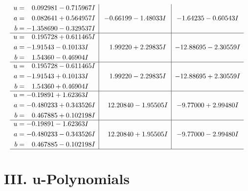 \documentclass[1p]{elsarticle_modified}
\theoremstyle{definition}
\begin{document}
$$\begin{array}{c|c|c}
\begin{aligned}
u &= \phantom{-}0.092981 - 0.715967 I \\
a &= \phantom{-}0.082641 + 0.564957 I \\
b &= -1.358690 - 0.329537 I\end{aligned}
 & -0.66199 - 1.48033 I & -1.64235 - 0.60543 I \\ \hline\begin{aligned}
u &= \phantom{-}0.195728 + 0.611465 I \\
a &= -1.91543 - 0.10133 I \\
b &= \phantom{-}1.54360 - 0.46904 I\end{aligned}
 & \phantom{-}1.99220 + 2.29835 I & -12.88695 - 2.30559 I \\ \hline\begin{aligned}
u &= \phantom{-}0.195728 - 0.611465 I \\
a &= -1.91543 + 0.10133 I \\
b &= \phantom{-}1.54360 + 0.46904 I\end{aligned}
 & \phantom{-}1.99220 - 2.29835 I & -12.88695 + 2.30559 I \\ \hline\begin{aligned}
u &= -0.19891 + 1.62363 I \\
a &= -0.480233 + 0.343526 I \\
b &= \phantom{-}0.467885 + 0.102198 I\end{aligned}
 & \phantom{-}12.20840 - 1.95505 I & -9.77000 + 2.99480 I \\ \hline\begin{aligned}
u &= -0.19891 - 1.62363 I \\
a &= -0.480233 - 0.343526 I \\
b &= \phantom{-}0.467885 - 0.102198 I\end{aligned}
 & \phantom{-}12.20840 + 1.95505 I & -9.77000 - 2.99480 I\\
 \hline 
 \end{array}$$\newpage
\newpage\renewcommand{\arraystretch}{1}
\centering \section*{ III. u-Polynomials}
\end{document}
